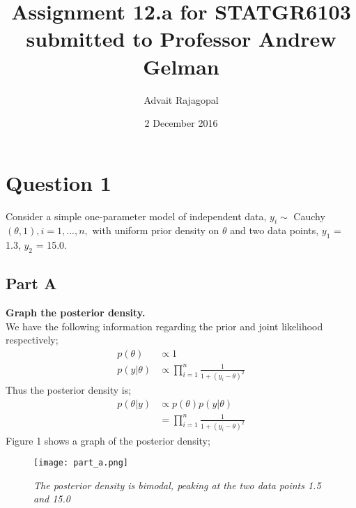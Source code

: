 \documentclass{article}
\title{Assignment 12.a for \textbf{STATGR6103}\\
\large submitted to Professor Andrew Gelman}
\date{2 December 2016}
\author{Advait Rajagopal}
\begin{document}
  \maketitle
  \section{Question 1}
Consider a simple one-parameter model of independent data, $y_i \sim$ Cauchy$(\theta, 1), i = 1, . . . , n,$ with uniform prior density on $\theta$ and two data points, $y_1$ = 1.3, $y_2$ = 15.0.
\subsection{Part A}
\textbf{Graph the posterior density.}\\
We have the following information regarding the prior and joint likelihood respectively;
\begin{align*}
p(\theta) &\propto 1\\
p(y | \theta) &\propto  \prod_{i = 1}^{n}\frac{1}{1 + (y_i - \theta)^2}
\end{align*}
Thus the posterior density is;
\begin{align*}
p(\theta | y) &\propto p(\theta)p(y | \theta)\\
&= \prod_{i = 1}^{n}\frac{1}{1 + (y_i - \theta)^2}
\end{align*}
Figure 1 shows a graph of the posterior density;
 \begin{figure}[H]
\centering
\texttt{[image: part\_a.png]}
\caption{\textit{The posterior density is bimodal, peaking at the two data points 1.5 and 15.0}}
\label{deltat}
\end{figure}
\end{document}
